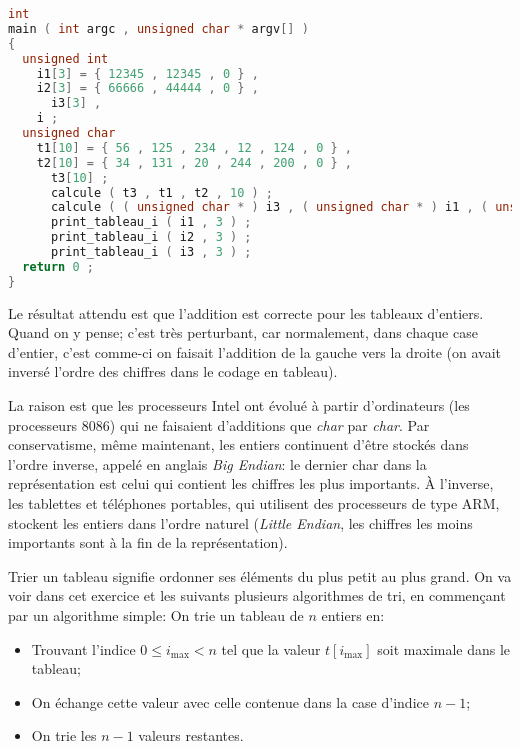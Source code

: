 \begin{solutioncachee}
\begin{lstlisting}[language=C]
int
main ( int argc , unsigned char * argv[] )
{
  unsigned int
    i1[3] = { 12345 , 12345 , 0 } ,
    i2[3] = { 66666 , 44444 , 0 } ,
      i3[3] ,
	i ;
  unsigned char
    t1[10] = { 56 , 125 , 234 , 12 , 124 , 0 } ,
    t2[10] = { 34 , 131 , 20 , 244 , 200 , 0 } ,
      t3[10] ;
      calcule ( t3 , t1 , t2 , 10 ) ;
      calcule ( ( unsigned char * ) i3 , ( unsigned char * ) i1 , ( unsigned char * ) i2 , 3 * sizeof ( int ) ) ;
      print_tableau_i ( i1 , 3 ) ;
      print_tableau_i ( i2 , 3 ) ;
      print_tableau_i ( i3 , 3 ) ;
  return 0 ;
}    
  \end{lstlisting}
  Le résultat attendu est que l'addition est correcte pour les
  tableaux d'entiers. Quand on y pense; c'est très perturbant, car
  normalement, dans chaque case d'entier, c'est comme-ci on faisait
  l'addition de la gauche vers la droite (on avait inversé l'ordre des
  chiffres dans le codage en tableau).

  La raison est que les processeurs Intel ont évolué à partir
  d'ordinateurs (les processeurs 8086) qui ne faisaient d'additions
  que \emph{char} par \emph{char}. Par conservatisme, même maintenant,
  les entiers continuent d'être stockés dans l'ordre inverse, appelé
  en anglais \emph{Big Endian}: le dernier char dans la représentation
  est celui qui contient les chiffres les plus importants. À
  l'inverse, les tablettes et téléphones portables, qui utilisent des
  processeurs de type ARM, stockent les entiers dans l'ordre naturel
  (\emph{Little Endian}, les chiffres les moins importants sont à la
  fin de la représentation). 
\end{solutioncachee}


Trier un tableau signifie ordonner ses éléments du plus petit au plus
grand. On va voir dans cet exercice et les suivants plusieurs algorithmes de
tri, en commençant par un algorithme simple:
On trie un tableau de \(n\) entiers en:
\begin{itemize}
\item Trouvant l'indice \(0\le i_{\text{max}}<n\) tel que la valeur
  \(t[i_{\text{max}}]\) soit maximale dans le tableau;
\item On échange cette valeur avec celle contenue dans la case d'indice \(n-1\);
\item On trie les \(n-1\) valeurs restantes.
\end{itemize}

